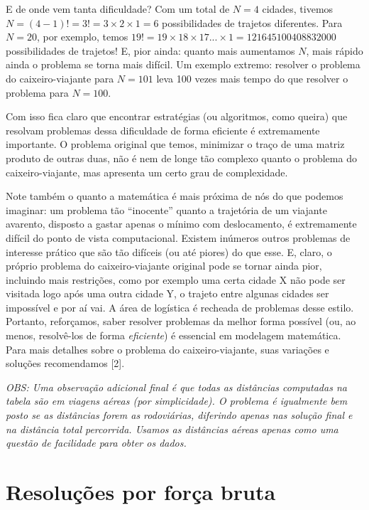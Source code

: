 \documentclass[11pt]{article}
\begin{document}
E de onde vem tanta dificuldade? Com um total de \(N = 4\) cidades,
tivemos \(N = (4-1)! = 3! = 3\times 2\times 1 = 6\) possibilidades de
trajetos diferentes. Para \(N = 20\), por exemplo, temos
\(19! = 19\times 18 \times 17 ... \times 1 = 121645100408832000\)
possibilidades de trajetos! E, pior ainda: quanto mais aumentamos \(N\),
mais rápido ainda o problema se torna mais difícil. Um exemplo extremo:
resolver o problema do caixeiro-viajante para \(N = 101\) leva 100 vezes
mais tempo do que resolver o problema para \(N = 100\).

Com isso fica claro que encontrar estratégias (ou algoritmos, como
queira) que resolvam problemas dessa dificuldade de forma eficiente é
extremamente importante. O problema original que temos, minimizar o
traço de uma matriz produto de outras duas, não é nem de longe tão
complexo quanto o problema do caixeiro-viajante, mas apresenta um certo
grau de complexidade.

Note também o quanto a matemática é mais próxima de nós do que podemos
imaginar: um problema tão ``inocente'' quanto a trajetória de um
viajante avarento, disposto a gastar apenas o mínimo com deslocamento, é
extremamente difícil do ponto de vista computacional. Existem inúmeros
outros problemas de interesse prático que são tão difíceis (ou até
piores) do que esse. E, claro, o próprio problema do caixeiro-viajante
original pode se tornar ainda pior, incluindo mais restrições, como por
exemplo uma certa cidade X não pode ser visitada logo após uma outra
cidade Y, o trajeto entre algunas cidades ser impossível e por aí vai. A
área de logística é recheada de problemas desse estilo. Portanto,
reforçamos, saber resolver problemas da melhor forma possível (ou, ao
menos, resolvê-los de forma \emph{eficiente}) é essencial em modelagem
matemática. Para mais detalhes sobre o problema do caixeiro-viajante,
suas variações e soluções recomendamos {[}2{]}.

\emph{OBS: Uma observação adicional final é que todas as distâncias
computadas na tabela são em viagens aéreas (por simplicidade). O
problema é igualmente bem posto se as distâncias forem as rodoviárias,
diferindo apenas nas solução final e na distância total percorrida.
Usamos as distâncias aéreas apenas como uma questão de facilidade para
obter os dados.}

    \hypertarget{resoluuxe7uxf5es-por-foruxe7a-bruta}{%
\section{Resoluções por força
bruta}\label{resoluuxe7uxf5es-por-foruxe7a-bruta}}
\end{document}
